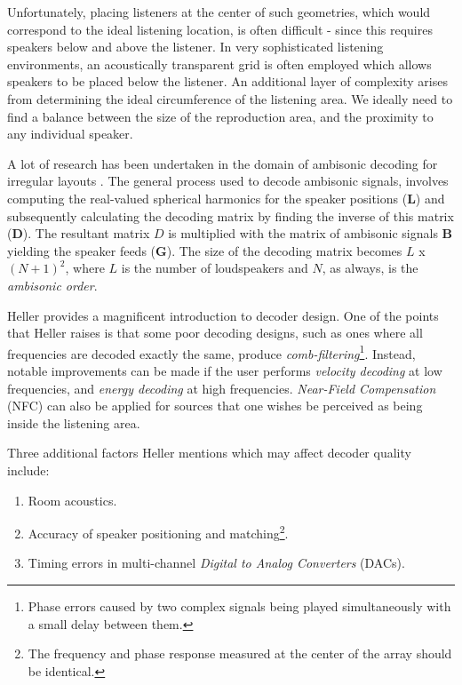 Unfortunately, placing listeners at the center of such geometries, which would correspond to the ideal listening location, is often difficult - since this requires speakers below and above the listener. In very sophisticated listening environments, an acoustically transparent grid is often employed which allows speakers to be placed below the listener. An additional layer of complexity arises from determining the ideal circumference of the listening area. We ideally need to find a balance between the size of the reproduction area, and the proximity to any individual speaker. 

A lot of research has been undertaken in the domain of ambisonic decoding for irregular layouts \cite{heller2008my}. The general process used to decode ambisonic signals, involves computing the real-valued spherical harmonics for the speaker positions ($\mathbf{L}$) and subsequently calculating the decoding matrix by finding the inverse of this matrix ($\mathbf{D}$). The resultant matrix $D$ is multiplied with the matrix of ambisonic signals $\mathbf{B}$ yielding the speaker feeds ($\mathbf{G}$). The size of the decoding matrix becomes $L$ x $(N + 1)^2$, where $L$ is the number of loudspeakers and $N$, as always, is the \textit{ambisonic order}. 

Heller \cite{heller2008my} provides a magnificent introduction to decoder design. One of the points that Heller raises is that some poor decoding designs, such as ones where all frequencies are decoded exactly the same, produce \textit{comb-filtering}\footnote{Phase errors caused by two complex signals being played simultaneously with a small delay between them.}. Instead, notable improvements can be made if the user performs \textit{velocity decoding} at low frequencies, and \textit{energy decoding} at high frequencies. \textit{Near-Field Compensation} (NFC) can also be applied for sources that one wishes be perceived as being inside the listening area. 

Three additional factors Heller mentions which may affect decoder quality include: 

\begin{enumerate}
    \item Room acoustics.
    \item Accuracy of speaker positioning and matching\footnote{The frequency and phase response measured at the center of the array should be identical.}.
    \item Timing errors in multi-channel \textit{Digital to Analog Converters} (DACs).
\end{enumerate}

